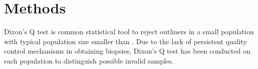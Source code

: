 \chapter{Methods}

Dixon's Q test is common statistical tool to reject outliners in a small population with typical population size smaller than . Due to the lack of persistent quality control mechanisms in obtaining biopsies, Dixon's Q test has been conducted on each population to distinguish possible invalid samples. 